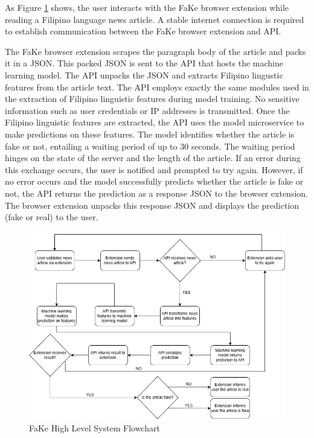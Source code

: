 As Figure \ref{SystemFlowchart} shows, the user interacts with the FaKe browser extension while reading a Filipino language news article. A stable internet connection is required to establish communication between the FaKe browser extension and API.

The FaKe browser extension scrapes the paragraph body of the article and packs it in a JSON. This packed JSON is sent to the API that hosts the machine learning model. The API unpacks the JSON and extracts Filipino lingustic features from the article text. The API employs exactly the same modules used in the extraction of Filipino linguistic features during model training. No sensitive information such as user credentials or IP addresses is transmitted. Once the Filipino linguistic features are extracted, the API uses the model microservice to make predictions on these features. The model identifies whether the article is fake or not, entailing a waiting period of up to 30 seconds. The waiting period hinges on the state of the server and the length of the article. If an error during this exchange occurs, the user is notified and prompted to try again. However, if no error occurs and the model successfully predicts whether the article is fake or not, the API returns the prediction as a response JSON to the browser extension. The browser extension unpacks this response JSON and displays the prediction (fake or real) to the user.

\begin{figure}[h]
\includegraphics[width=\textwidth,height=\textheight,keepaspectratio]{figures/FakeSystemFlowchart.png}
  \caption{FaKe High Level System Flowchart}
  \label{SystemFlowchart}
\end{figure}
\clearpage

